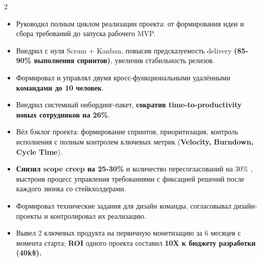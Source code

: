 \documentclass[10pt,a4paper,ragged2e,withhyper]{custom-altacv}
\begin{document}


\makecvheader



\begin{paracol}{2}


\begin{itemize}
	\item Руководил полным циклом реализации проекта: от формирования идеи и сбора требований до запуска рабочего MVP.
	\item Внедрил с нуля Scrum + Kanban, повысив предсказуемость delivery \textbf{(85-90\% выполнения спринтов)}, увеличив стабильность релизов. 
	\item Формировал и управлял двумя кросс-функциональными удалёнными \textbf{командами до 10 человек}.
    \item Внедрил системный онбординг-пакет, \textbf{сократив time-to-productivity новых сотрудников на 26\%}.
    \item Вёл бэклог проекта: формирование спринтов, приоритизация,  контроль исполнения с полным контролем ключевых метрик (\textbf{Velocity, Burndown, Cycle Time}). 
    \item \textbf{Снизил scope creep на 25-30\%} и количество пересогласований на 30\% , выстроив процесс управления требованиями с фиксацией решений после каждого звонка со стейкхолдерами.
    \item Формировал технические задания для дизайн команды, согласовывал дизайн-проекты и контролировал их реализацию.
    \item Вывел 2 ключевых продукта на первичную монетизацию за 6 месяцев с момента старта;\textbf{ ROI} одного проекта составил \textbf{1}\textbf{0X к бюджету разработки} \textbf{(40k\$). }
\end{itemize}


\end{paracol}
\end{document}
